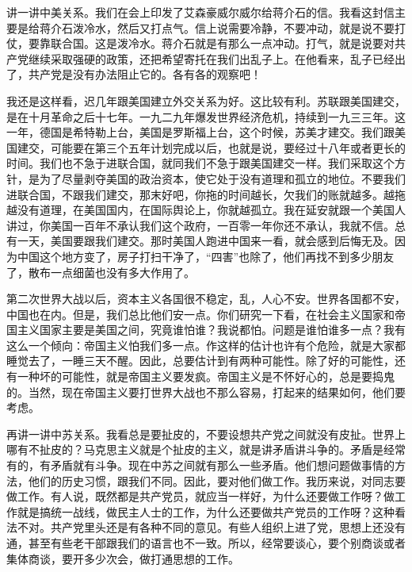 讲一讲中美关系。我们在会上印发了艾森豪威尔威尔给蒋介石的信。我看这封信主要是给蒋介石泼冷水，然后又打点气。信上说需要冷静，不要冲动，就是说不要打仗，要靠联合国。这是泼冷水。蒋介石就是有那么一点冲动。打气，就是说要对共产党继续采取强硬的政策，还把希望寄托在我们出乱子上。在他看来，乱子已经出了，共产党是没有办法阻止它的。各有各的观察吧！

我还是这样看，迟几年跟美国建立外交关系为好。这比较有利。苏联跟美国建交，是在十月革命之后十七年。一九二九年爆发世界经济危机，持续到一九三三年。这一年，德国是希特勒上台，美国是罗斯福上台，这个时候，苏美才建交。我们跟美国建交，可能要在第三个五年计划完成以后，也就是说，要经过十八年或者更长的时间。我们也不急于进联合国，就同我们不急于跟美国建交一样。我们采取这个方针，是为了尽量剥夺美国的政治资本，使它处于没有道理和孤立的地位。不要我们进联合国，不跟我们建交，那末好吧，你拖的时间越长，欠我们的账就越多。越拖越没有道理，在美国国内，在国际舆论上，你就越孤立。我在延安就跟一个美国人讲过，你美国一百年不承认我们这个政府，一百零一年你还不承认，我就不信。总有一天，美国要跟我们建交。那时美国人跑进中国来一看，就会感到后悔无及。因为中国这个地方变了，房子打扫干净了，“四害”也除了，他们再找不到多少朋友了，散布一点细菌也没有多大作用了。

第二次世界大战以后，资本主义各国很不稳定，乱，人心不安。世界各国都不安，中国也在内。但是，我们总比他们安一点。你们研究一下看，在社会主义国家和帝国主义国家主要是美国之间，究竟谁怕谁？我说都怕。问题是谁怕谁多一点？我有这么一个倾向：帝国主义怕我们多一点。作这样的估计也许有个危险，就是大家都睡觉去了，一睡三天不醒。因此，总要估计到有两种可能性。除了好的可能性，还有一种坏的可能性，就是帝国主义要发疯。帝国主义是不怀好心的，总是要捣鬼的。当然，现在帝国主义要打世界大战也不那么容易，打起来的结果如何，他们要考虑。

再讲一讲中苏关系。我看总是要扯皮的，不要设想共产党之间就没有皮扯。世界上哪有不扯皮的？马克思主义就是个扯皮的主义，就是讲矛盾讲斗争的。矛盾是经常有的，有矛盾就有斗争。现在中苏之间就有那么一些矛盾。他们想问题做事情的方法，他们的历史习惯，跟我们不同。因此，要对他们做工作。我历来说，对同志要做工作。有人说，既然都是共产党员，就应当一样好，为什么还要做工作呀？做工作就是搞统一战线，做民主人士的工作，为什么还要做共产党员的工作呀？这种看法不对。共产党里头还是有各种不同的意见。有些人组织上进了党，思想上还没有通，甚至有些老干部跟我们的语言也不一致。所以，经常要谈心，要个别商谈或者集体商谈，要开多少次会，做打通思想的工作。

